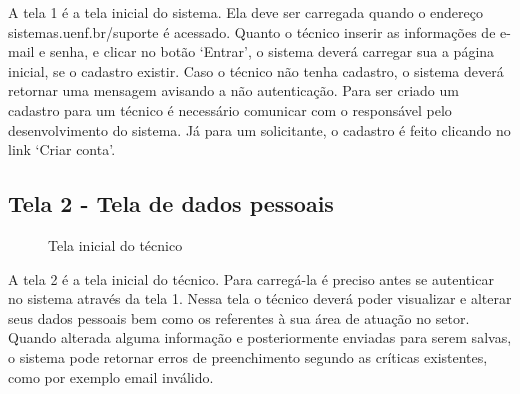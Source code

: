 A tela 1 é a tela inicial do sistema. Ela deve ser carregada quando o endereço sistemas.uenf.br/suporte é acessado. Quanto o técnico inserir as informações de e-mail e senha, e clicar no botão ‘Entrar’, o sistema deverá carregar sua a página inicial, se o cadastro existir. Caso o técnico não tenha cadastro, o sistema deverá retornar uma mensagem avisando a não autenticação. Para ser criado um cadastro para um técnico é necessário comunicar com o responsável pelo desenvolvimento do sistema. Já para um solicitante, o cadastro é feito clicando no link ‘Criar conta’.

\newpage

\subsection{Tela 2 - Tela de dados pessoais}

\begin{figure}[ht]
    \centering
    \caption{Tela inicial do técnico}
\end{figure}

A tela 2 é a tela inicial do técnico. Para carregá-la é preciso antes se autenticar no sistema através da tela 1. Nessa tela o técnico deverá poder visualizar e alterar seus dados pessoais bem como os referentes à sua área de atuação no setor. Quando alterada alguma informação e posteriormente enviadas para serem salvas, o sistema pode retornar erros de preenchimento segundo as críticas existentes, como por exemplo email inválido. 

